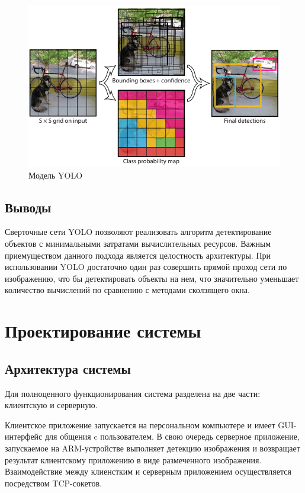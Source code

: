 \documentclass[a4paper,english,russian]{G2-105}
\begin{document}
\begin{figure}
\begin{center}
    \includegraphics[width=0.7\linewidth]{yoloiter.png}
    \caption{Модель YOLO}
	\label{yoloiter}
\end{center}
\end{figure} 
\ttl
\section{Выводы} \ttl
\par Сверточные сети YOLO позволяют реализовать алгоритм детектирование объектов с минимальными затратами вычислительных ресурсов. Важным приемуществом данного подхода является целостность архитектуры. При использовании YOLO достаточно один раз совершить прямой проход сети по изображению, что бы детектировать объекты на нем, что значительно уменьшает количество вычислений по сравнению с методами сколзящего окна.

\chapter{Проектирование системы} \ttl \ttl
\section{Архитектура системы} \ttl
\par Для полноценного функционирования система разделена на две части: клиентскую и серверную.
\par Клиентское приложение запускается на персональном компьютере и имеет GUI-интерфейс для общения c пользователем. В свою очередь серверное приложение, запускаемое на ARM-устройстве выполняет детекцию изображения и возвращает результат клиентскому приложению в виде размеченного изображения. Взаимодействие между клиенстким и серверным приложением осуществляется посредством TCP-сокетов.
\ttl
\end{document}
